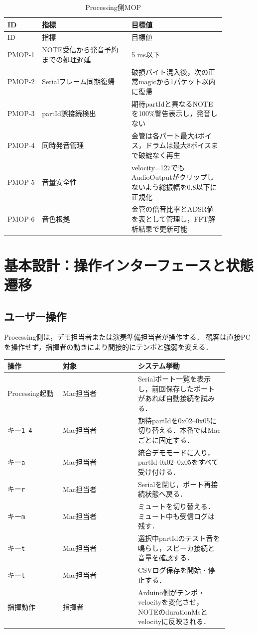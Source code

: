 \documentclass[a4paper,11pt]{jsarticle}
\begin{document}
\begin{longtable}{p{0.13\linewidth}p{0.36\linewidth}p{0.38\linewidth}}
\caption{Processing側MOP}\label{tab:mop}\\
\hline
ID & 指標 & 目標値 \\
\hline
\endfirsthead
\hline
ID & 指標 & 目標値 \\
\hline
\endhead
PMOP-1 & NOTE受信から発音予約までの処理遅延 & 5 ms以下 \\
\hline
PMOP-2 & Serialフレーム同期復帰 & 破損バイト混入後，次の正常magicから1パケット以内に復帰 \\
\hline
PMOP-3 & partId誤接続検出 & 期待partIdと異なるNOTEを100\%警告表示し，発音しない \\
\hline
PMOP-4 & 同時発音管理 & 金管は各パート最大4ボイス，ドラムは最大8ボイスまで破綻なく再生 \\
\hline
PMOP-5 & 音量安全性 & velocity=127でもAudioOutputがクリップしないよう総振幅を0.8以下に正規化 \\
\hline
PMOP-6 & 音色根拠 & 金管の倍音比率とADSR値を表として管理し，FFT解析結果で更新可能 \\
\hline
\end{longtable}

\section{基本設計：操作インターフェースと状態遷移}

\subsection{ユーザー操作}

Processing側は，デモ担当者または演奏準備担当者が操作する．
観客は直接PCを操作せず，指揮者の動きにより間接的にテンポと強弱を変える．

\begin{longtable}{p{0.22\linewidth}p{0.30\linewidth}p{0.36\linewidth}}
\hline
操作 & 対象 & システム挙動 \\
\hline
\endhead
Processing起動 & Mac担当者 & Serialポート一覧を表示し，前回保存したポートがあれば自動接続を試みる． \\
\hline
キー\texttt{1}--\texttt{4} & Mac担当者 & 期待partIdを0x02--0x05に切り替える．本番ではMacごとに固定する． \\
\hline
キー\texttt{a} & Mac担当者 & 統合デモモードに入り，partId 0x02--0x05をすべて受け付ける． \\
\hline
キー\texttt{r} & Mac担当者 & Serialを閉じ，ポート再接続状態へ戻る． \\
\hline
キー\texttt{m} & Mac担当者 & ミュートを切り替える．ミュート中も受信ログは残す． \\
\hline
キー\texttt{t} & Mac担当者 & 選択中partIdのテスト音を鳴らし，スピーカ接続と音量を確認する． \\
\hline
キー\texttt{l} & Mac担当者 & CSVログ保存を開始・停止する． \\
\hline
指揮動作 & 指揮者 & Arduino側がテンポ・velocityを変化させ，NOTEのdurationMsとvelocityに反映される． \\
\hline
\end{longtable}
\end{document}
